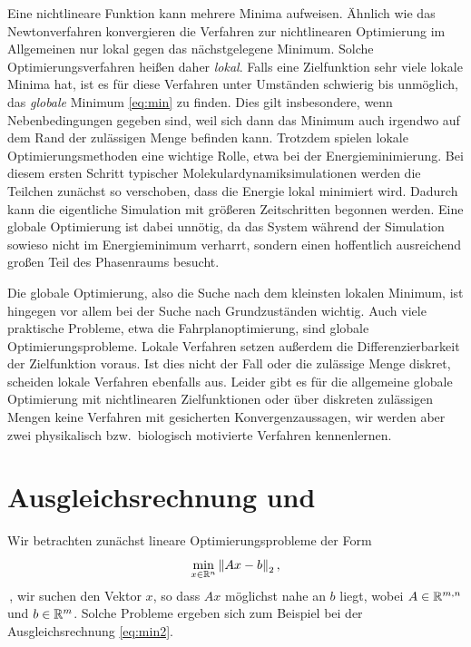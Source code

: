 Eine nichtlineare Funktion kann mehrere Minima aufweisen. Ähnlich wie
das Newtonverfahren konvergieren die Verfahren zur nichtlinearen
Optimierung im Allgemeinen nur lokal gegen das nächstgelegene Minimum.
Solche Optimierungsverfahren heißen daher \emph{lokal}. Falls eine
Zielfunktion sehr viele lokale Minima hat, ist es für diese Verfahren
unter Umständen schwierig bis unmöglich, das \emph{globale} Minimum
\eqref{eq:min} zu finden. Dies gilt insbesondere, wenn
Nebenbedingungen gegeben sind, weil sich dann das Minimum auch
irgendwo auf dem Rand der zulässigen Menge befinden kann. Trotzdem
spielen lokale Optimierungsmethoden eine wichtige Rolle, etwa bei der
Energieminimierung. Bei diesem ersten Schritt typischer
Molekulardynamiksimulationen werden die Teilchen zunächst so
verschoben, dass die Energie lokal minimiert wird. Dadurch kann die
eigentliche Simulation mit größeren Zeitschritten begonnen
werden. Eine globale Optimierung ist dabei unnötig, da das System
während der Simulation sowieso nicht im Energieminimum verharrt,
sondern einen hoffentlich ausreichend großen Teil des Phasenraums
besucht.

Die globale Optimierung, also die Suche nach dem kleinsten lokalen
Minimum, ist hingegen vor allem bei der Suche nach Grundzuständen
wichtig. Auch viele praktische Probleme, etwa die Fahrplanoptimierung,
sind globale Optimierungsprobleme. Lokale Verfahren setzen außerdem
die Differenzierbarkeit der Zielfunktion voraus. Ist dies nicht der
Fall oder die zulässige Menge diskret, scheiden lokale Verfahren
ebenfalls aus. Leider gibt es für die allgemeine globale Optimierung
mit nichtlinearen Zielfunktionen oder über diskreten zulässigen Mengen
keine Verfahren mit gesicherten Konvergenzaussagen, wir werden aber
zwei physikalisch bzw.\ biologisch motivierte Verfahren kennenlernen.

\section{Ausgleichsrechnung und }

Wir betrachten zunächst lineare Optimierungsprobleme der Form
\begin{equation}
  \label{eq:optnorm2}
  \min_{x\in\mathbb{R}^n} \left\lVert{Ax-b}\right\rVert_2,
\end{equation}
\dh\,, wir suchen den Vektor $x$, so dass $Ax$ möglichst nahe an $b$
liegt, wobei $A\in\mathbb{R}^{m,n}$ und $b\in\mathbb{R}^{m}$.  Solche Probleme
ergeben sich zum Beispiel bei der Ausgleichsrechnung
\eqref{eq:min2}.

